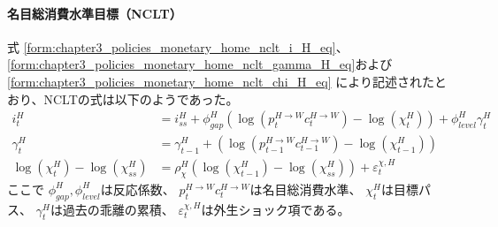 \paragraph{名目総消費水準目標（NCLT）}
\label{sec:chapter5_beta_shock_policies_nclt}
式
\eqref{form:chapter3_policies_monetary_home_nclt_i_H_eq}、
\eqref{form:chapter3_policies_monetary_home_nclt_gamma_H_eq}および
\eqref{form:chapter3_policies_monetary_home_nclt_chi_H_eq}
により記述されたとおり、NCLTの式は以下のようであった。
\begin{align}
\label{form:chapter5_beta_shock_policies_nclt_i_H_eq}
    i_t^H&=i_{ss}^H+\phi_{gap}^H(\log(p_t^{H\to W}c_t^{H\to W})-\log(\chi_t^H))+\phi_{level}^H\gamma_t^H \\
\label{form:chapter5_beta_shock_policies_nclt_gamma_H_eq}
    \gamma_t^H&=\gamma_{t-1}^H+(\log(p_{t-1}^{H\to W}c_{t-1}^{H\to W})-\log(\chi_{t-1}^H)) \\
\label{form:chapter5_beta_shock_policies_nclt_chi_H_eq}
    \log(\chi_t^H)-\log(\chi_{ss}^H)&=\rho_{\chi}^H\left(\log(\chi_{t-1}^H)-\log(\chi_{ss}^H)\right)+\varepsilon_t^{\chi,H}
\end{align}
ここで
\(\phi_{gap}^H, \phi_{level}^H\)は反応係数、
\(p_t^{H\to W}c_t^{H\to W}\)は名目総消費水準、
\(\chi_t^H\)は目標パス、
\(\gamma_t^H\)は過去の乖離の累積、
\(\varepsilon_t^{\chi,H}\)は外生ショック項である。
